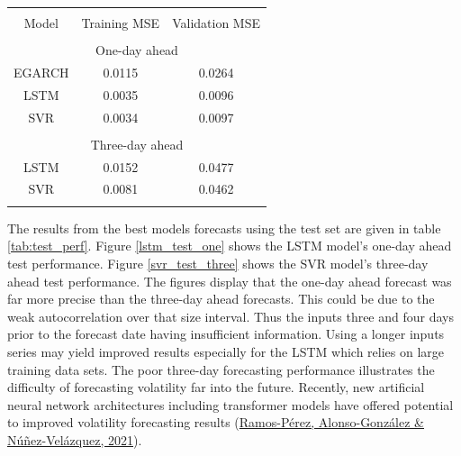 \documentclass[11pt,preprint, authoryear]{elsarticle}
\let\origtable\table
\let\endorigtable\endtable
\renewenvironment{table}[1][2] {
    \expandafter\origtable\expandafter[H]
} {
    \endorigtable
}
\numberwithin{equation}{section}
\numberwithin{figure}{section}
\numberwithin{table}{section}
\begin{document}
\begin{table}[ht]
    \centering
    \caption{Best hyperparameters training and validation performance}
    \begin{tabular}{ccc}
    \\[-1.8ex]\hline 
\hline \\[-1.8ex] 
        Model & Training MSE & Validation MSE\\
        \hline \\[-1.8ex] 
        \multicolumn{3}{c}{One-day ahead} \\
        \hline
        EGARCH & 0.0115 &  0.0264 \\
        LSTM & 0.0035 & 0.0096\\
        SVR & 0.0034 & 0.0097\\
        \hline \\[-1.8ex] 
        \multicolumn{3}{c}{Three-day ahead} \\
        \hline
        LSTM & 0.0152 & 0.0477\\
        SVR & 0.0081 & 0.0462\\
        \hline \\[-1.8ex] 
    \end{tabular}
    \label{tab:tune_perf}
\end{table}

The results from the best models forecasts using the test set are given
in table \ref{tab:test_perf}. Figure \ref{lstm_test_one} shows the LSTM
model's one-day ahead test performance. Figure \ref{svr_test_three}
shows the SVR model's three-day ahead test performance. The figures
display that the one-day ahead forecast was far more precise than the
three-day ahead forecasts. This could be due to the weak autocorrelation
over that size interval. Thus the inputs three and four days prior to
the forecast date having insufficient information. Using a longer inputs
series may yield improved results especially for the LSTM which relies
on large training data sets. The poor three-day forecasting performance
illustrates the difficulty of forecasting volatility far into the
future. Recently, new artificial neural network architectures including
transformer models have offered potential to improved volatility
forecasting results
(\protect\hyperlink{ref-vol-transformer}{Ramos-Pérez, Alonso-González \&
Núñez-Velázquez, 2021}).
\end{document}
